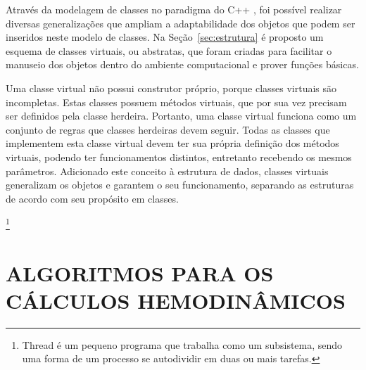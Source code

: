 Através da modelagem de classes no paradigma do C++ \cite{AlanParker}, foi possível realizar diversas generalizações que ampliam a adaptabilidade dos objetos que podem ser inseridos neste modelo de classes. Na Seção~\ref{sec:estrutura} é proposto um esquema de classes virtuais, ou abstratas, que foram criadas para facilitar o manuseio dos objetos dentro do ambiente computacional e prover funções básicas. 

Uma classe virtual não possui construtor próprio, porque classes virtuais são incompletas. Estas classes possuem métodos virtuais, que por sua vez precisam ser definidos pela classe herdeira. Portanto, uma classe virtual funciona como um conjunto de regras que classes herdeiras devem seguir. Todas as classes que implementem esta classe virtual devem ter sua própria definição dos métodos virtuais, podendo ter funcionamentos distintos, entretanto recebendo os mesmos parâmetros.  Adicionado este conceito à estrutura de dados, classes virtuais generalizam os objetos e garantem o seu funcionamento, separando as estruturas de acordo com seu propósito em classes.


\footnote{Thread é um pequeno programa que trabalha como um subsistema, sendo uma forma de um processo se autodividir em duas ou mais tarefas.}

\section{ALGORITMOS PARA OS CÁLCULOS HEMODINÂMICOS}
\label{sec:algoritmo}


